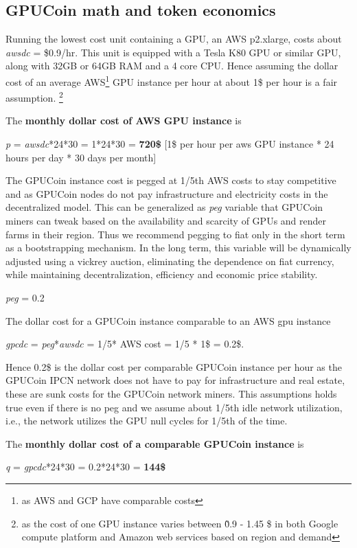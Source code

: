\subsection{GPUCoin math and token economics}
Running the lowest cost unit containing a GPU, an AWS p2.xlarge, costs about \emph{awsdc} = \$0.9/hr. This unit is equipped with a Tesla K80 GPU or similar GPU, along with 32GB or 64GB RAM and a 4 core CPU. 
Hence assuming the dollar cost of an average AWS\footnote{as AWS and GCP have comparable costs} GPU instance per hour at about 1\$ per hour is a fair assumption. \footnote{ as the cost of one GPU instance varies between \~ 0.9 - 1.45 \$ in both Google compute platform and Amazon web services based on region and demand}

The \textbf{monthly dollar cost of AWS GPU instance} is

\emph{p} = \emph{awsdc}*24*30 = 1*24*30 = \textbf{720\$  } [1\$ per hour per aws GPU instance * 24 hours per day * 30 days per month]

The GPUCoin instance cost is pegged at 1/5th AWS costs to stay competitive
 and as GPUCoin nodes do not pay infrastructure and electricity costs in the decentralized model.
  This can be generalized as \emph{peg} variable that GPUCoin miners can tweak based on the availability and scarcity of GPUs and render farms in their region. Thus we recommend pegging to fiat only in the short term as a bootstrapping mechanism. In the long term, this variable will be dynamically adjusted using a vickrey auction, eliminating the dependence on fiat currency, while maintaining decentralization, efficiency and economic price stability. 

\emph{peg} = 0.2

The dollar cost for a GPUCoin instance comparable to an AWS gpu instance 

\emph{gpcdc} = \emph{peg}*\emph{awsdc} =  1/5* AWS cost = 1/5 * 1\$ = 0.2\$.

Hence 0.2\$ is the dollar cost per comparable GPUCoin instance per hour as the GPUCoin IPCN network does not have to pay for infrastructure and real estate, these are sunk costs for the GPUCoin network miners. This assumptions holds true even if there is no peg and we assume about 1/5th idle network utilization, i.e., the network utilizes the GPU null cycles for 1/5th of the time.

The \textbf{monthly dollar cost of a comparable GPUCoin instance} is 

\emph{q} = \emph{gpcdc}*24*30 = 0.2*24*30 = \textbf{144\$ }

